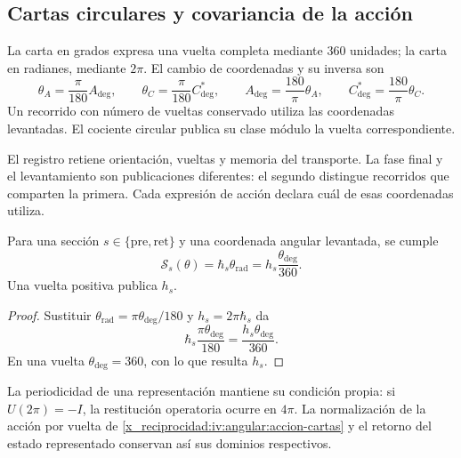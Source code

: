 \subsection{Cartas circulares y covariancia de la acción}
\label{x_reciprocidad:iv:angular:cartas}

\begin{definition}
\label{x_reciprocidad:iv:angular:unidades}
La carta en grados expresa una vuelta completa mediante \(360\)
unidades; la carta en radianes, mediante \(2\pi\). El cambio
de coordenadas y su inversa son
\begin{equation}
 \theta_A=\frac{\pi}{180}A_{\deg},\qquad
 \theta_C=\frac{\pi}{180}C^*_{\deg},\qquad
 A_{\deg}=\frac{180}{\pi}\theta_A,\qquad
 C^*_{\deg}=\frac{180}{\pi}\theta_C.
 \label{x_reciprocidad:iv:angular:cambio-carta}
\end{equation}
Un recorrido con número de vueltas conservado utiliza las
coordenadas levantadas. El cociente circular publica su
clase módulo la vuelta correspondiente.
\end{definition}

El registro retiene orientación, vueltas y memoria del transporte.
La fase final y el levantamiento son publicaciones diferentes:
el segundo distingue recorridos que comparten la primera.
Cada expresión de acción declara cuál de esas coordenadas utiliza.

\begin{proposition}
\label{x_reciprocidad:iv:angular:accion}
Para una sección \(s\in\{\mathrm{pre},\mathrm{ret}\}\) y una
coordenada angular levantada, se cumple
\begin{equation}
 \mathcal S_s(\theta)
 =\hbar_s\theta_{\mathrm{rad}}
 =h_s\frac{\theta_{\deg}}{360}.
 \label{x_reciprocidad:iv:angular:accion-cartas}
\end{equation}
Una vuelta positiva publica \(h_s\).
\end{proposition}
\begin{proof}
Sustituir
\(\theta_{\mathrm{rad}}=\pi\theta_{\deg}/180\) y
\(h_s=2\pi\hbar_s\) da
\[
 \hbar_s\frac{\pi\theta_{\deg}}{180}
 =\frac{h_s\theta_{\deg}}{360}.
\]
En una vuelta \(\theta_{\deg}=360\), con lo que resulta \(h_s\).
\end{proof}

La periodicidad de una representación mantiene su condición
propia: si \(U(2\pi)=-I\), la restitución operatoria ocurre
en \(4\pi\). La normalización de la acción por vuelta de
\eqref{x_reciprocidad:iv:angular:accion-cartas} y el retorno del estado
representado conservan así sus dominios respectivos.

